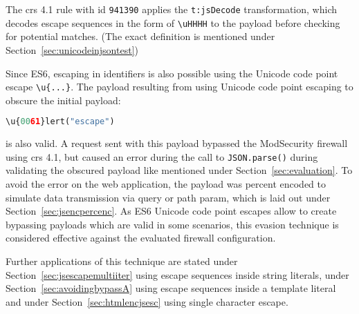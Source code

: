 The \acrshort{crs} 4.1 rule with id \verb|941390| applies the \verb|t:jsDecode| transformation, which decodes escape sequences in the form of \verb|\uHHHH| to the payload before checking for potential matches. \cite{modsec/transjsdecode} (The exact definition is mentioned under Section~\ref{sec:unicodeinjsontest})

Since ES6, escaping in identifiers is also possible using the Unicode code point escape \verb|\u{...}|. The payload resulting from using Unicode code point escaping to obscure the initial payload:

\begin{lstlisting}[style=basicStyle, language=Python, caption=\textbackslash u\{0061\}lert('escape') bypass]
\u{0061}lert("escape")
\end{lstlisting}

is also valid. A request sent with this payload bypassed the ModSecurity firewall using \acrshort{crs} 4.1, but caused an error during the call to \verb|JSON.parse()| during validating the obscured payload like mentioned under Section~\ref{sec:evaluation}. 
To avoid the error on the web application, the payload was percent encoded to simulate data transmission via query or path param, which is laid out under Section~\ref{sec:jsencpercenc}. As ES6 Unicode code point escapes allow to create bypassing payloads which are valid in some scenarios, this evasion technique is considered effective against the evaluated firewall configuration.

Further applications of this technique are stated under Section~\ref{sec:jsescapemultiiter} using escape sequences inside string literals, under Section~\ref{sec:avoidingbypassA} using escape sequences inside a template literal and under Section~\ref{sec:htmlencjsesc} using single character escape.

%
%
%

